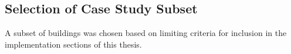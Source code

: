 \subsection{Selection of Case Study Subset}
\label{casestudysubset}

A subset of buildings was chosen based on limiting criteria for inclusion in the implementation sections of this thesis. 